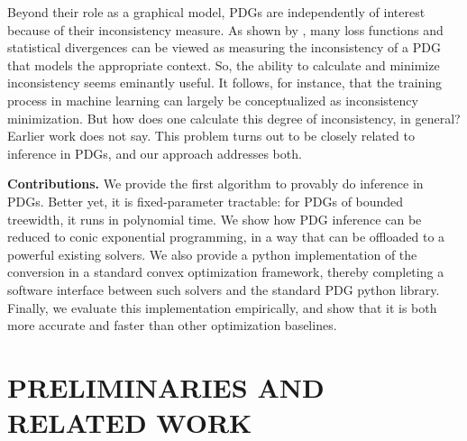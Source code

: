 \documentclass[twoside]{article}
\begin{document}
Beyond their role as a graphical model, PDGs 
    are independently of interest because of their inconsistency measure. 
    As shown by \textcite{one-true-loss},
    many loss functions and statistical divergences
        can be viewed as measuring the inconsistency
        of a PDG that models the appropriate context.
    So, the ability to calculate and minimize inconsistency seems eminantly useful.
    It follows, for instance, that the training process in machine learning can largely be conceptualized as inconsistency minimization.
    But how {does} one calculate this degree of inconsistency, in general?
    Earlier work does not say.
    This problem turns out to be closely related to inference in PDGs,
    and our approach addresses both.



\textbf{Contributions.}
We provide the first algorithm to provably do inference in PDGs.
Better yet, it is fixed-parameter tractable: for PDGs of bounded treewidth,
    it runs in polynomial time.
We show how PDG inference can be reduced to conic exponential programming,
    in a way that can be offloaded to a powerful existing solvers.
We also provide a python implementation of the conversion in a standard convex optimization framework, thereby completing a software interface between such solvers and the standard PDG python library.
Finally, we evaluate this implementation empirically, and show that it is both more accurate and faster than other optimization baselines.
%

\section{PRELIMINARIES AND RELATED WORK}
\end{document}
